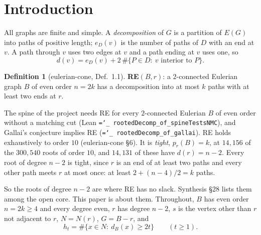 \documentclass[11pt]{amsart}
\theoremstyle{definition}
\newtheorem{definition}[theorem]{Definition}
\newcommand{\pr}{p_r}
\newcommand{\lean}[1]{\texttt{\hyphenchar\font=`\_ #1}}
\begin{document}
\section{Introduction}

All graphs are finite and simple. A \emph{decomposition} of $G$ is a partition of $E(G)$ into paths
of positive length; $e_D(v)$ is the number of paths of $D$ with an end at $v$. A path through $v$
uses two edges at $v$ and a path ending at $v$ uses one, so
\begin{equation}\label{eq:par}
d(v)=e_D(v)+2\,\#\{P\in D:\ v\text{ interior to }P\}.
\end{equation}

\begin{definition}[eulerian-cone, Def.~1.1]
\textbf{RE}$(B,r)$: a $2$-connected Eulerian graph $B$ of even order $n=2k$ has a decomposition into at
most $k$ paths with at least two ends at $r$.
\end{definition}

The spine of the project needs RE for every $2$-connected Eulerian $B$ of even order without a
matching cut (Lean \lean{rootedDecomp\_of\_spineTestsNMC}), and Gallai's conjecture implies RE
(\lean{rootedDecomp\_of\_gallai}). RE holds exhaustively to order $10$ (eulerian-cone \S6). It is
\emph{tight}, $\pr(B)=k$, at $14{,}156$ of the $300{,}540$ roots of order $10$, and $14{,}131$ of these
have $d(r)=n-2$. Every root of degree $n-2$ is tight, since $r$ is an end of at least two paths and every
other path meets $r$ at most once: at least $2+(n-4)/2=k$ paths.

So the roots of degree $n-2$ are where RE has no slack. Synthesis \S28 lists them among the open
core. This paper is about them. Throughout, $B$ has even order $n=2k\ge 4$ and every degree even, $r$
has degree $n-2$, $s$ is the vertex other than $r$ not adjacent to $r$, $N=N(r)$, $G=B-r$, and
\[
h_t=\#\{x\in N:\ d_B(x)\ge 2t\}\qquad(t\ge1).
\]
\end{document}
